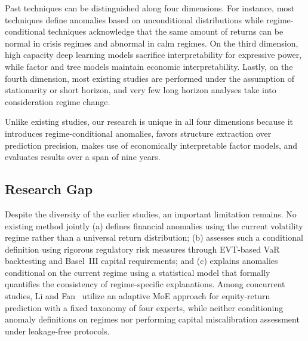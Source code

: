 \documentclass[]{interact}
\begin{document}
\begin{table}[t]
{}
\label{tab:comparison}
\end{table}

Past techniques can be distinguished along four dimensions. For instance, most techniques define anomalies based on unconditional distributions while regime-conditional techniques acknowledge that the same amount of returns can be normal in crisis regimes and abnormal in calm regimes. On the third dimension, high capacity deep learning models sacrifice interpretability for expressive power, while factor and tree models maintain economic interpretability. Lastly, on the fourth dimension, most existing studies are performed under the assumption of stationarity or short horizon, and very few long horizon analyses take into consideration regime change.

Unlike existing studies, our research is unique in all four dimensions because it introduces regime-conditional anomalies, favors structure extraction over prediction precision, makes use of economically interpretable factor models, and evaluates results over a span of nine years.

\subsection{Research Gap}
Despite the diversity of the earlier studies, an important limitation remains.
No existing method jointly (a) defines financial anomalies using the current
volatility regime rather than a universal return distribution; (b) assesses
such a conditional definition using rigorous regulatory risk measures through
EVT-based VaR backtesting and Basel~III capital requirements; and (c) explains
anomalies conditional on the current regime using a statistical model that
formally quantifies the consistency of regime-specific explanations. Among
concurrent studies, Li and Fan~\citep{fan2025expla} utilize an adaptive MoE
approach for equity-return prediction with a fixed taxonomy of four experts,
while neither conditioning anomaly definitions on regimes nor performing
capital miscalibration assessment under leakage-free protocols.
\end{document}

